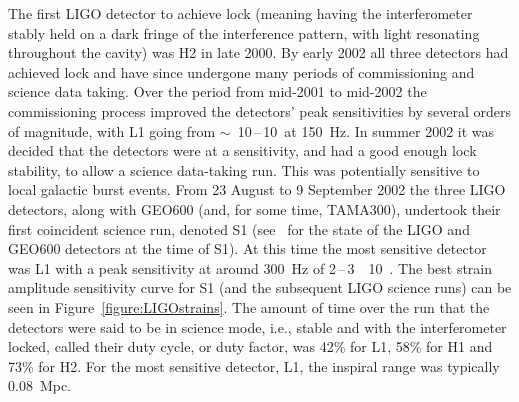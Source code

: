 The first LIGO detector to achieve lock (meaning having the interferometer
stably held on a dark fringe of the interference pattern, with light resonating
throughout the cavity) was H2 in late 2000. By early 2002 all three detectors
had achieved lock and have since undergone many periods of commissioning and
science data taking. Over the period from mid-2001 to mid-2002 the
commissioning process improved the detectors' peak sensitivities by several
orders of magnitude, with L1 going from
$\sim$~10\,--\,10~\Hz at 150~Hz. In summer 2002
it was decided that the detectors were at a sensitivity, and had a
good enough lock stability, to allow a science data-taking run. This
was potentially sensitive to local galactic burst events. From 23
August to 9 September 2002 the three LIGO detectors, along with GEO600
(and, for some time, TAMA300), undertook their first coincident
science run, denoted S1 (see~\cite{Abbott:2004a} for the state of the
LIGO and GEO600 detectors at the time of S1). At this time the most
sensitive detector was L1 with a peak sensitivity at around 300~Hz of
2\,--\,3~\texttimes~10~\Hz. The best strain
amplitude sensitivity curve for S1 (and the subsequent LIGO science runs) can be seen in
Figure~\ref{figure:LIGOstrains}. The amount of time over the run that
the detectors were said to be in science mode, i.e., stable and with
the interferometer locked, called their duty cycle, or duty factor,
was 42\% for L1, 58\% for H1 and 73\% for H2. For the most sensitive
detector, L1, the inspiral range was typically 0.08~Mpc.